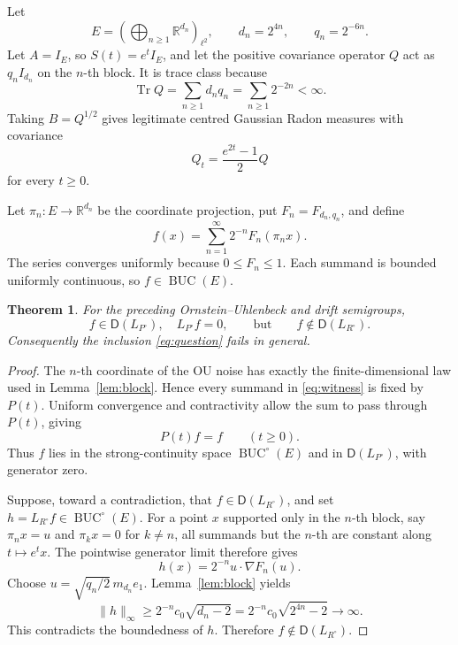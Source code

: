 \documentclass[11pt]{article}
\newtheorem{theorem}{Theorem}
\newcommand{\BUC}{\operatorname{BUC}}
\newcommand{\D}{\mathsf D}
\newcommand{\R}{\mathbb R}
\begin{document}
Let
\[
 E=\left(\bigoplus_{n\ge1}\R^{d_n}\right)_{\ell^2},
 \qquad d_n=2^{4n},\qquad q_n=2^{-6n}.
\]
Let $A=I_E$, so $S(t)=e^tI_E$, and let the positive covariance operator
$Q$ act as $q_nI_{d_n}$ on the $n$-th block.  It is trace class because
\[
                \operatorname{Tr}Q
                =\sum_{n\ge1}d_nq_n
                =\sum_{n\ge1}2^{-2n}<\infty.
\]
Taking $B=Q^{1/2}$ gives legitimate centred Gaussian Radon measures with
covariance
\[
                  Q_t=\frac{e^{2t}-1}{2}Q
\]
for every $t\ge0$.

Let $\pi_n:E\to\R^{d_n}$ be the coordinate projection, put
$F_n=F_{d_n,q_n}$, and define
\begin{equation}\label{eq:witness}
                  f(x)=\sum_{n=1}^\infty 2^{-n}F_n(\pi_nx).
\end{equation}
The series converges uniformly because $0\le F_n\le1$.  Each summand is
bounded uniformly continuous, so $f\in\BUC(E)$.

\begin{theorem}\label{thm:counterexample}
For the preceding Ornstein--Uhlenbeck and drift semigroups,
\[
       f\in\D(L_{P^\circ}),\quad L_{P^\circ}f=0,
       \qquad\text{but}\qquad
       f\notin\D(L_{R^\circ}).
\]
Consequently the inclusion \eqref{eq:question} fails in general.
\end{theorem}

\begin{proof}
The $n$-th coordinate of the OU noise has exactly the finite-dimensional
law used in Lemma~\ref{lem:block}.  Hence every summand in
\eqref{eq:witness} is fixed by $P(t)$.  Uniform convergence and contractivity
allow the sum to pass through $P(t)$, giving
\[
                         P(t)f=f\qquad(t\ge0).
\]
Thus $f$ lies in the strong-continuity space $\BUC^\circ(E)$ and in
$\D(L_{P^\circ})$, with generator zero.

Suppose, toward a contradiction, that $f\in\D(L_{R^\circ})$, and set
$h=L_{R^\circ}f\in\BUC^\circ(E)$.  For a point $x$ supported only in the
$n$-th block, say $\pi_nx=u$ and $\pi_kx=0$ for $k\ne n$, all summands but
the $n$-th are constant along $t\mapsto e^tx$.  The pointwise generator
limit therefore gives
\[
                         h(x)=2^{-n}u\cdot\nabla F_n(u).
\]
Choose $u=\sqrt{q_n/2}\,m_{d_n}e_1$.  Lemma~\ref{lem:block} yields
\[
 \lVert h\rVert_\infty
 \ge 2^{-n}c_0\sqrt{d_n-2}
 =2^{-n}c_0\sqrt{2^{4n}-2}\longrightarrow\infty.
\]
This contradicts the boundedness of $h$.  Therefore
$f\notin\D(L_{R^\circ})$.
\end{proof}
\end{document}
